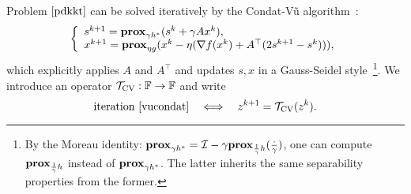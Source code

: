 {{
Problem $\eqref{pdkkt}$ can be solved iteratively by the Condat-V\~{u} algorithm~\cite{condat2013primal, vu2013splitting}:
\begin{equation}
\left\{
\begin{array}{l}
s^{k+1}=\prox_{\gamma h^*} (s^k+\gamma Ax^k),\\
x^{k+1}=\prox_{\eta g}(x^k-\eta(\nabla f(x^k)+A^\top(2s^{k+1}-s^k))),
\end{array}
\right.\label{vucondat}
\end{equation}
which explicitly applies $A$ and $A^\top$ and updates $s,x$ in a Gauss-Seidel style~\footnote{By the Moreau identity: $\mathbf{prox}_{\gamma h^*}={\mathcal{I}} -\gamma \mathbf{prox}_{\frac{1}{\gamma}h}(\frac{\cdot}{\gamma})$, one can compute $\mathbf{prox}_{\frac{1}{\gamma} h}$ instead of $\mathbf{prox}_{\gamma h^*}$. The latter inherits the same separability properties from the former.}.
We introduce an operator ${{\mathcal{T}}_{\textnormal{CV}}}:\mathbb{F}\to \mathbb{F}$ and write 
$$\mbox{iteration \eqref{vucondat}}\quad\Longleftrightarrow\quad z^{k+1}={{\mathcal{T}}_{\textnormal{CV}}}(z^k).$$ 

}}
